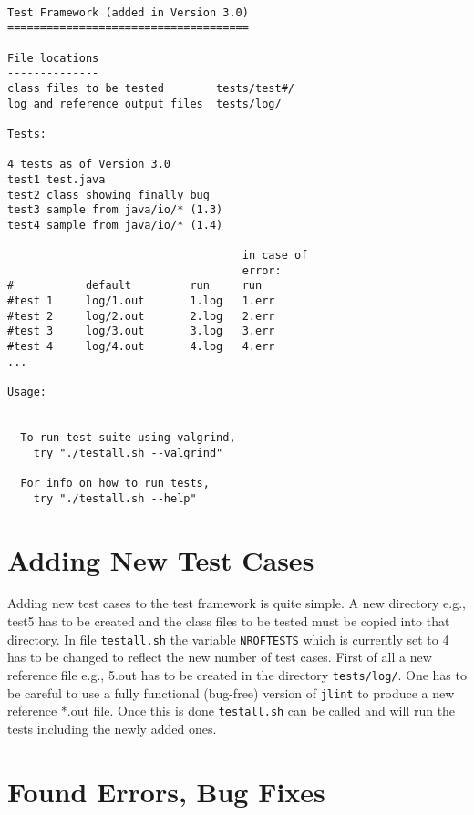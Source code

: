 \documentclass[11pt,twoside,a4paper,draft]{article}
\begin{document}
\begin{verbatim}

Test Framework (added in Version 3.0)
=====================================

File locations
--------------
class files to be tested        tests/test#/
log and reference output files  tests/log/

Tests:
------
4 tests as of Version 3.0
test1 test.java
test2 class showing finally bug
test3 sample from java/io/* (1.3)
test4 sample from java/io/* (1.4)

                                    in case of
                                    error:
#           default         run     run
#test 1     log/1.out       1.log   1.err
#test 2     log/2.out       2.log   2.err
#test 3     log/3.out       3.log   3.err
#test 4     log/4.out       4.log   4.err
...

Usage:
------

  To run test suite using valgrind, 
	try "./testall.sh --valgrind"

  For info on how to run tests, 
	try "./testall.sh --help"

\end{verbatim}



\section {Adding New Test Cases}

Adding new test cases to the test framework is quite simple. A new directory
 e.g., test5 has to be created and the class files to be tested must be copied
 into that directory. In file \texttt{testall.sh} the variable
 \texttt{NROFTESTS} which is currently set to 4 has to be changed to reflect 
the new number of test cases. First of all a new reference file e.g., 5.out
 has to be created in the directory \texttt{tests/log/}. One has to be careful
 to use a fully functional (bug-free) version of \texttt{jlint} to produce a
 new reference *.out file. Once this is done \texttt{testall.sh} can be called
 and will run the tests including the newly added ones.

\section {Found Errors, Bug Fixes}
\end{document}
